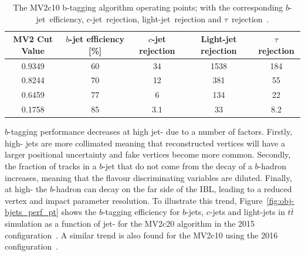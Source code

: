 \begin{table}[!htb]
  \begin{center}
    \begin{tabular}{|c||c|c|c|c|}
      \hline
      MV2 Cut Value  &  $b$-jet efficiency [\%]  &     $c$-jet rejection   &   Light-jet rejection  &    $\tau$ rejection  \\
      \hline
      0.9349         &           60              &           34          &      1538              &     184              \\
      0.8244         &           70              &           12          &       381              &      55              \\
      0.6459         &           77              &           6           &       134              &      22              \\
      0.1758         &           85              &           3.1         &        33              &     8.2              \\
      \hline
    \end{tabular}
    \caption[The MV2c10 b-tagging algorithm operating points; with the corresponding $b$-jet~efficiency, $c$-jet~rejection, light-jet~rejection and $\tau$~rejection.]
            {The MV2c10 b-tagging algorithm operating points; with the corresponding $b$-jet~efficiency, $c$-jet~rejection, light-jet~rejection and $\tau$~rejection~\cite{obj-bjets_algo_2016}.}
            \label{tab:obj-MV2_WPs}
  \end{center}
  \vspace{-2em}
\end{table}

$b$-tagging performance decreases at high jet-\pT{} due to a number of factors.
Firstly, high-\pT{} jets are more collimated meaning that reconstructed vertices
will have a larger positional uncertainty and fake vertices become more common.
Secondly, the fraction of tracks in a $b$-jet that do not come from the decay of a $b$-hadron increases,
meaning that the flavour discriminating variables are diluted.
Finally, at high-\pT{} the $b$-hadron can decay on the far side of the IBL, leading to a reduced vertex and impact parameter resolution.
To illustrate this trend, Figure~\ref{fig:obj-bjets_perf_pt} shows the $b$-tagging efficiency for $b$-jets, $c$-jets and light-jets in $t\bar{t}$ simulation as a function of jet-\pT{}
for the MV2c20 algorithm in the 2015 configuration~\cite{obj-bjets_algo_2015}. A similar trend is also found for the MV2c10 using the 2016 configuration~\cite{obj-bjets_algo_2016}.


